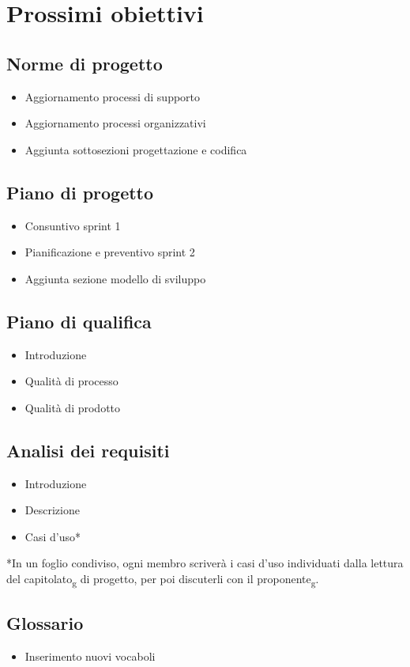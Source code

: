 \section{Prossimi obiettivi}
        \subsection{Norme di progetto}
            \begin{itemize}
                \item Aggiornamento processi di supporto
                \item Aggiornamento processi organizzativi
                \item Aggiunta sottosezioni progettazione e codifica
            \end{itemize}
        \subsection{Piano di progetto}
            \begin{itemize}
                \item Consuntivo sprint 1
                \item Pianificazione e preventivo sprint 2
                \item Aggiunta sezione modello di sviluppo
            \end{itemize}
        \subsection{Piano di qualifica}
            \begin{itemize}
                \item Introduzione
                \item Qualità di processo
                \item Qualità di prodotto
            \end{itemize}
        \subsection{Analisi dei requisiti}
            \begin{itemize}
                \item Introduzione
                \item Descrizione
                \item Casi d'uso* 
            \end{itemize}   
            \small{*In un foglio condiviso, ogni membro scriverà i casi d'uso 
            individuati dalla lettura del capitolato\textsubscript{g} di progetto, 
            per poi discuterli con il proponente\textsubscript{g}.} 
        \subsection{Glossario}
            \begin{itemize}
                \item Inserimento nuovi vocaboli
            \end{itemize}
        